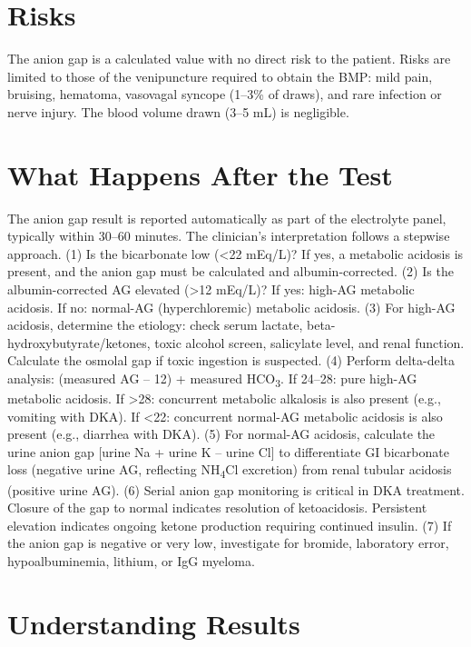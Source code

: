 \section*{Risks}
The anion gap is a calculated value with no direct risk to the patient. Risks are limited to those of the venipuncture required to obtain the BMP: mild pain, bruising, hematoma, vasovagal syncope (1--3\% of draws), and rare infection or nerve injury. The blood volume drawn (3--5 mL) is negligible.

\section*{What Happens After the Test}
The anion gap result is reported automatically as part of the electrolyte panel, typically within 30--60 minutes. The clinician's interpretation follows a stepwise approach. (1) Is the bicarbonate low (<22 mEq/L)? If yes, a metabolic acidosis is present, and the anion gap must be calculated and albumin-corrected. (2) Is the albumin-corrected AG elevated (>12 mEq/L)? If yes: high-AG metabolic acidosis. If no: normal-AG (hyperchloremic) metabolic acidosis. (3) For high-AG acidosis, determine the etiology: check serum lactate, beta-hydroxybutyrate/ketones, toxic alcohol screen, salicylate level, and renal function. Calculate the osmolal gap if toxic ingestion is suspected. (4) Perform delta-delta analysis: (measured AG -- 12) + measured HCO\textsubscript{3}. If 24--28: pure high-AG metabolic acidosis. If >28: concurrent metabolic alkalosis is also present (e.g., vomiting with DKA). If <22: concurrent normal-AG metabolic acidosis is also present (e.g., diarrhea with DKA). (5) For normal-AG acidosis, calculate the urine anion gap [urine Na + urine K -- urine Cl] to differentiate GI bicarbonate loss (negative urine AG, reflecting NH\textsubscript{4}Cl excretion) from renal tubular acidosis (positive urine AG). (6) Serial anion gap monitoring is critical in DKA treatment. Closure of the gap to normal indicates resolution of ketoacidosis. Persistent elevation indicates ongoing ketone production requiring continued insulin. (7) If the anion gap is negative or very low, investigate for bromide, laboratory error, hypoalbuminemia, lithium, or IgG myeloma.

\section*{Understanding Results}

